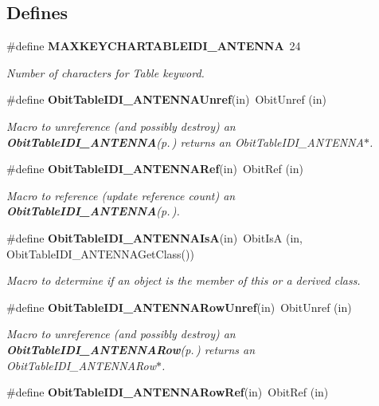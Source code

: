 \subsection*{Defines}
\begin{CompactItemize}
\item 
\#define {\bf MAXKEYCHARTABLEIDI\_\-ANTENNA}\ 24
\begin{CompactList}\small\item\em Number of characters for Table keyword. \item\end{CompactList}\item 
\#define {\bf Obit\-Table\-IDI\_\-ANTENNAUnref}(in)\ Obit\-Unref (in)
\begin{CompactList}\small\item\em Macro to unreference (and possibly destroy) an {\bf Obit\-Table\-IDI\_\-ANTENNA}{\rm (p.\,\pageref{structObitTableIDI__ANTENNA})} returns an Obit\-Table\-IDI\_\-ANTENNA$\ast$. \item\end{CompactList}\item 
\#define {\bf Obit\-Table\-IDI\_\-ANTENNARef}(in)\ Obit\-Ref (in)
\begin{CompactList}\small\item\em Macro to reference (update reference count) an {\bf Obit\-Table\-IDI\_\-ANTENNA}{\rm (p.\,\pageref{structObitTableIDI__ANTENNA})}. \item\end{CompactList}\item 
\#define {\bf Obit\-Table\-IDI\_\-ANTENNAIs\-A}(in)\ Obit\-Is\-A (in, Obit\-Table\-IDI\_\-ANTENNAGet\-Class())
\begin{CompactList}\small\item\em Macro to determine if an object is the member of this or a derived class. \item\end{CompactList}\item 
\#define {\bf Obit\-Table\-IDI\_\-ANTENNARow\-Unref}(in)\ Obit\-Unref (in)
\begin{CompactList}\small\item\em Macro to unreference (and possibly destroy) an {\bf Obit\-Table\-IDI\_\-ANTENNARow}{\rm (p.\,\pageref{structObitTableIDI__ANTENNARow})} returns an Obit\-Table\-IDI\_\-ANTENNARow$\ast$. \item\end{CompactList}\item 
\#define {\bf Obit\-Table\-IDI\_\-ANTENNARow\-Ref}(in)\ Obit\-Ref (in)

\end{CompactItemize}
